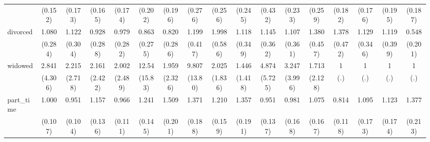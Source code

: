 {\begin{tabular}{l*{16}{c}}
                    &     (0.152)         &     (0.173)         &     (0.165)         &     (0.174)         &     (0.202)         &     (0.196)         &     (0.276)         &     (0.256)         &     (0.245)         &     (0.432)         &     (0.233)         &     (0.259)         &     (0.182)         &     (0.176)         &     (0.195)         &     (0.187)         \\
[1em]
divorced            &       1.080         &       1.122         &       0.928         &       0.979         &       0.863         &       0.820         &       1.199         &       1.998\sym{*}  &       1.118         &       1.145         &       1.107         &       1.380         &       1.378         &       1.129         &       1.119         &       0.548         \\
                    &     (0.284)         &     (0.304)         &     (0.288)         &     (0.282)         &     (0.275)         &     (0.286)         &     (0.417)         &     (0.586)         &     (0.349)         &     (0.362)         &     (0.361)         &     (0.457)         &     (0.472)         &     (0.346)         &     (0.399)         &     (0.201)         \\
[1em]
widowed             &       2.841         &       2.215         &       2.161         &       2.002         &       12.54\sym{*}  &       1.959         &       9.807         &       2.025         &       1.446         &       4.874         &       3.247         &       1.713         &           1         &           1         &           1         &           1         \\
                    &     (4.306)         &     (2.718)         &     (2.422)         &     (2.489)         &     (15.83)         &     (2.326)         &     (13.80)         &     (1.836)         &     (1.418)         &     (5.725)         &     (3.996)         &     (2.128)         &         (.)         &         (.)         &         (.)         &         (.)         \\
[1em]
part\_time           &       1.000         &       0.951         &       1.157         &       0.966         &       1.241         &       1.509\sym{**} &       1.371\sym{*}  &       1.210         &       1.357\sym{*}  &       0.951         &       0.981         &       1.075         &       0.814         &       1.095         &       1.123         &       1.377\sym{*}  \\
                    &     (0.107)         &     (0.104)         &     (0.136)         &     (0.111)         &     (0.145)         &     (0.201)         &     (0.188)         &     (0.159)         &     (0.191)         &     (0.137)         &     (0.168)         &     (0.167)         &     (0.118)         &     (0.173)         &     (0.174)         &     (0.213)         \\

\end{tabular}}
